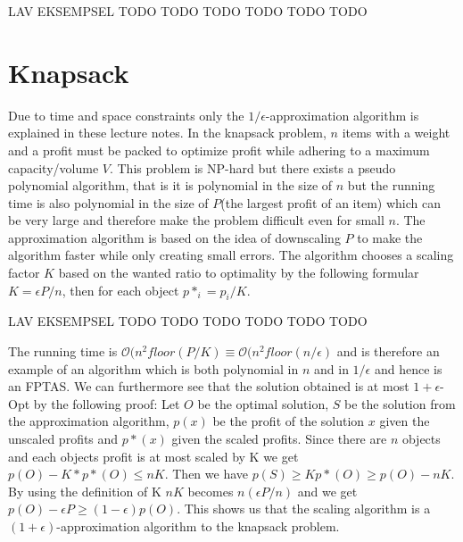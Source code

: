 \newpar LAV EKSEMPSEL TODO TODO TODO TODO TODO TODO

\section{Knapsack}
Due to time and space constraints only the $1/\epsilon$-approximation algorithm is explained in these lecture notes. In the knapsack problem, $n$ items with a weight and a profit must be packed to optimize profit while adhering to a maximum capacity/volume $V$. This problem is NP-hard but there exists a pseudo polynomial algorithm, that is it is polynomial in the size of $n$ but the running time is also polynomial in the size of $P$(the largest profit of an item) which can be very large and therefore make the problem difficult even for small $n$. The approximation algorithm is based on the idea of downscaling $P$ to make the algorithm faster while only creating small errors. The algorithm chooses a scaling factor $K$ based on the wanted ratio to optimality by the following formular $K=\epsilon P/n$, then for each object $p*_i = p_i/K$. 

\newpar LAV EKSEMPSEL TODO TODO TODO TODO TODO TODO

\newpar The running time is $\mathcal{O}(n^2 floor(P/K) \equiv \mathcal{O}(n^2 floor(n/\epsilon)$ and is therefore an example of an algorithm which is both polynomial in $n$ and in $1/\epsilon$ and hence is an FPTAS. We can furthermore see that the solution obtained is at most $1+\epsilon$-Opt by the following proof: Let $O$ be the optimal solution, $S$ be the solution from the approximation algorithm, $p(x)$ be the profit of the solution $x$ given the unscaled profits and $p*(x)$ given the scaled profits. Since there are $n$ objects and each objects profit is at most scaled by K we get $p(O) - K*p*(O) \le nK$. Then we have $p(S) \ge Kp*(O) \ge p(O)-n K$. By using the definition of K $n K$ becomes $n (\epsilon P/n)$ and we get $p(O) - \epsilon P \ge (1-\epsilon) p(O)$. This shows us that the scaling algorithm is a $(1+\epsilon)$-approximation algorithm to the knapsack problem.
